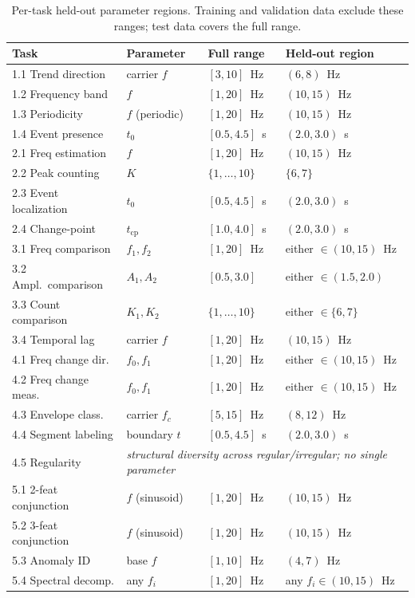 \documentclass[11pt]{article}
\begin{document}
\begin{table}[t]
\centering
\small
\caption{Per-task held-out parameter regions. Training and validation data exclude these ranges; test data covers the full range.}
\label{tab:heldout}
\begin{tabular}{llll}
\toprule
\textbf{Task} & \textbf{Parameter} & \textbf{Full range} & \textbf{Held-out region} \\
\midrule
1.1 Trend direction   & carrier $f$   & $[3, 10]$~Hz      & $(6, 8)$~Hz \\
1.2 Frequency band    & $f$           & $[1, 20]$~Hz      & $(10, 15)$~Hz \\
1.3 Periodicity       & $f$ (periodic)& $[1, 20]$~Hz      & $(10, 15)$~Hz \\
1.4 Event presence    & $t_0$         & $[0.5, 4.5]$~s    & $(2.0, 3.0)$~s \\
\midrule
2.1 Freq estimation   & $f$           & $[1, 20]$~Hz      & $(10, 15)$~Hz \\
2.2 Peak counting     & $K$           & $\{1,\ldots,10\}$ & $\{6, 7\}$ \\
2.3 Event localization& $t_0$         & $[0.5, 4.5]$~s    & $(2.0, 3.0)$~s \\
2.4 Change-point      & $t_\text{cp}$ & $[1.0, 4.0]$~s    & $(2.0, 3.0)$~s \\
\midrule
3.1 Freq comparison   & $f_1, f_2$    & $[1, 20]$~Hz      & either $\in (10, 15)$~Hz \\
3.2 Ampl.\ comparison & $A_1, A_2$    & $[0.5, 3.0]$      & either $\in (1.5, 2.0)$ \\
3.3 Count comparison  & $K_1, K_2$    & $\{1,\ldots,10\}$ & either $\in \{6, 7\}$ \\
3.4 Temporal lag      & carrier $f$   & $[1, 20]$~Hz      & $(10, 15)$~Hz \\
\midrule
4.1 Freq change dir.  & $f_0, f_1$    & $[1, 20]$~Hz      & either $\in (10, 15)$~Hz \\
4.2 Freq change meas. & $f_0, f_1$    & $[1, 20]$~Hz      & either $\in (10, 15)$~Hz \\
4.3 Envelope class.   & carrier $f_c$ & $[5, 15]$~Hz      & $(8, 12)$~Hz \\
4.4 Segment labeling  & boundary $t$  & $[0.5, 4.5]$~s    & $(2.0, 3.0)$~s \\
4.5 Regularity        & \multicolumn{3}{l}{\emph{structural diversity across regular/irregular; no single parameter}} \\
\midrule
5.1 2-feat conjunction& $f$ (sinusoid)& $[1, 20]$~Hz      & $(10, 15)$~Hz \\
5.2 3-feat conjunction& $f$ (sinusoid)& $[1, 20]$~Hz      & $(10, 15)$~Hz \\
5.3 Anomaly ID        & base $f$      & $[1, 10]$~Hz      & $(4, 7)$~Hz \\
5.4 Spectral decomp.  & any $f_i$     & $[1, 20]$~Hz      & any $f_i \in (10, 15)$~Hz \\
\bottomrule
\end{tabular}
\end{table}
\end{document}
